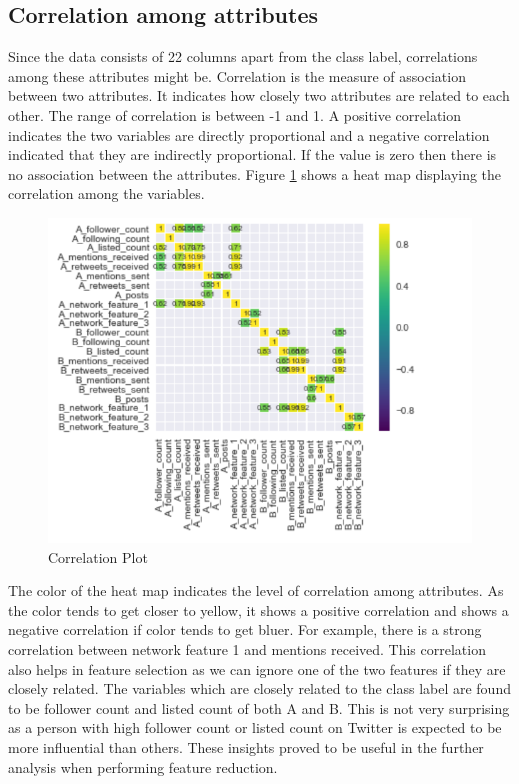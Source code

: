 \documentclass[sigconf]{acmart}
\begin{document}
\subsection{Correlation among attributes}

Since the data consists of 22 columns apart from the class label, correlations among these attributes might be. Correlation is the measure of association between two attributes. It indicates how closely two attributes are related to each other. The range of correlation is between -1 and 1. A positive correlation indicates the two variables are directly proportional and a negative correlation indicated that they are indirectly proportional. If the value is zero then there is no association between the attributes. Figure \ref{fig:Fig4} shows a heat map displaying the correlation among the variables. \\

\begin{figure}
\includegraphics[width=1.0\columnwidth]{images/fig4.png}
\caption{Correlation Plot}
\label{fig:Fig4}
\end{figure}

The color of the heat map indicates the level of correlation among attributes. As the color tends to get closer to yellow, it shows a positive correlation and shows a negative correlation if color tends to get bluer. For example, there is a strong correlation between network feature 1 and mentions received. This correlation also helps in feature selection as we can ignore one of the two features if they are closely related. The variables which are closely related to the class label are found to be follower count and listed count of both A and B. This is not very surprising as a person with high follower count or listed count on Twitter is expected to be more influential than others. These insights proved to be useful in the further analysis when performing feature reduction.
\end{document}
